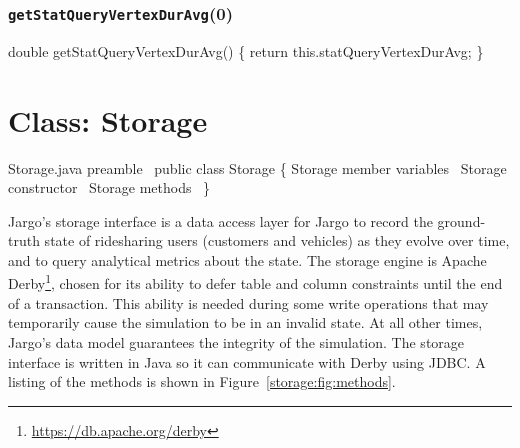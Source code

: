 \subsection{\texttt{getStatQueryVertexDurAvg}(0)}
\nwenddocs{}\endmoddef{}
double getStatQueryVertexDurAvg() \{
  return this.statQueryVertexDurAvg;
\}
\eatline
{}\nwendcode{}\nwdocspar
\nwenddocs{}\chapter{Class: Storage}
\label{storage}

\nwenddocs{}\endmoddef{}
\LA{}Storage.java preamble~{\nwtagstyle{}}\RA{}
public class Storage \{
  \LA{}\code{}Storage\edoc{} member variables~{\nwtagstyle{}}\RA{}
  \LA{}\code{}Storage\edoc{} constructor~{\nwtagstyle{}}\RA{}
  \LA{}\code{}Storage\edoc{} methods~{\nwtagstyle{}}\RA{}
\}
\nwendcode{}\nwdocspar

Jargo's storage interface is a data access layer for Jargo to record the
ground-truth state of ridesharing users (customers and vehicles) as they evolve
over time, and to query analytical metrics about the state.  The storage engine
is Apache Derby\footnote{\url{https://db.apache.org/derby}}, chosen for its
ability to defer table and column constraints until the end of a transaction.
This ability is needed during some write operations that may temporarily cause
the simulation to be in an invalid state. At all other times, Jargo's data
model guarantees the integrity of the simulation. The storage interface is
written in Java so it can communicate with Derby using JDBC. A listing of the
methods is shown in Figure~\ref{storage:fig:methods}.

